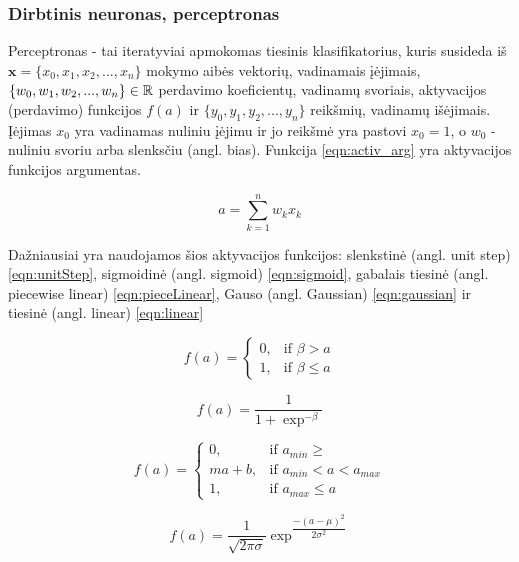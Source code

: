 \subsubsection{Dirbtinis neuronas, perceptronas}

Perceptronas -  tai iteratyviai apmokomas tiesinis klasifikatorius, kuris susideda iš $\boldsymbol{x} = \{x_{0}, x_{1}, x_{2}, ..., x_{n}\}$ mokymo aibės vektorių, vadinamais įėjimais, $\{w_{0}, w_{1}, w_{2}, ..., w_{n}\} \in \mathbb{R}$ perdavimo koeficientų, vadinamų svoriais, aktyvacijos (perdavimo) funkcijos $f(a)$ ir $\{y_{0}, y_{1}, y_{2}, ..., y_{n}\}$ reikšmių, vadinamų išėjimais. Įėjimas $x_{0}$ yra vadinamas nuliniu įėjimu ir jo reikšmė yra pastovi $x_{0} = 1$, o $w_{0}$ - nuliniu svoriu arba slenksčiu (angl. bias). Funkcija \ref{eqn:activ_arg} yra aktyvacijos funkcijos argumentas.

\begin{equation}
	\label{eqn:activ_arg}
	a = \sum_{k = 1}^{n} w_{k}x_k
\end{equation}

Dažniausiai yra naudojamos šios aktyvacijos funkcijos: slenkstinė (angl. unit step) \ref{eqn:unitStep}, sigmoidinė (angl. sigmoid) \ref{eqn:sigmoid}, gabalais tiesinė (angl. piecewise linear) \ref{eqn:pieceLinear}, Gauso (angl. Gaussian) \ref{eqn:gaussian} ir tiesinė (angl. linear) \ref{eqn:linear}

\begin{equation}
	\label{eqn:unitStep}
	f(a) =
	\begin{cases}
		0, & \mbox{if } \beta > a \\
		1, & \mbox{if } \beta \leq a
	\end{cases}
\end{equation}

\begin{equation}
	\label{eqn:sigmoid}
	f(a) = \dfrac{1}{1 + \exp^{-\beta }}
\end{equation}

\begin{equation}
	\label{eqn:pieceLinear}
	f(a) =
	\begin{cases}
		0, & \mbox{if } a_{min} \geq  \\
		ma + b, & \mbox{if } a_{min} < a < a_{max} \\
		1, & \mbox{if } a_{max} \leq a
	\end{cases}
\end{equation}

\begin{equation}
	\label{eqn:gaussian}
	f(a) = \dfrac{1}{\sqrt{2\pi\sigma}} \exp^{\dfrac{-(a - \mu)^2}{2\sigma^2}}
\end{equation}

